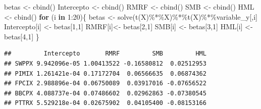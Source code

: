 \documentclass[
  12pt,
]{article}
\newenvironment{Shaded}{\begin{snugshade}}{\end{snugshade}}
\newcommand{\ControlFlowTok}[1]{\textcolor[rgb]{0.13,0.29,0.53}{\textbf{#1}}}
\newcommand{\DecValTok}[1]{\textcolor[rgb]{0.00,0.00,0.81}{#1}}
\newcommand{\FunctionTok}[1]{\textcolor[rgb]{0.00,0.00,0.00}{#1}}
\newcommand{\NormalTok}[1]{#1}
\newcommand{\OtherTok}[1]{\textcolor[rgb]{0.56,0.35,0.01}{#1}}
\newcommand{\SpecialCharTok}[1]{\textcolor[rgb]{0.00,0.00,0.00}{#1}}
\begin{document}
\begin{Shaded}
\begin{Highlighting}[]
\NormalTok{betas }\OtherTok{\textless{}{-}} \FunctionTok{cbind}\NormalTok{()}
\NormalTok{Intercepto }\OtherTok{\textless{}{-}} \FunctionTok{cbind}\NormalTok{()}
\NormalTok{RMRF }\OtherTok{\textless{}{-}} \FunctionTok{cbind}\NormalTok{()}
\NormalTok{SMB }\OtherTok{\textless{}{-}} \FunctionTok{cbind}\NormalTok{()}
\NormalTok{HML }\OtherTok{\textless{}{-}} \FunctionTok{cbind}\NormalTok{()}
\ControlFlowTok{for}\NormalTok{ (i }\ControlFlowTok{in} \DecValTok{1}\SpecialCharTok{:}\DecValTok{20}\NormalTok{)\{}
\NormalTok{  betas }\OtherTok{\textless{}{-}} \FunctionTok{solve}\NormalTok{(}\FunctionTok{t}\NormalTok{(X)}\SpecialCharTok{\%*\%}\NormalTok{X)}\SpecialCharTok{\%*\%}\FunctionTok{t}\NormalTok{(X)}\SpecialCharTok{\%*\%}\NormalTok{variable\_y[,i]}
\NormalTok{  Intercepto[i] }\OtherTok{\textless{}{-}}\NormalTok{ betas[}\DecValTok{1}\NormalTok{,}\DecValTok{1}\NormalTok{]}
\NormalTok{  RMRF[i]}\OtherTok{\textless{}{-}}\NormalTok{ betas[}\DecValTok{2}\NormalTok{,}\DecValTok{1}\NormalTok{]}
\NormalTok{  SMB[i] }\OtherTok{\textless{}{-}}\NormalTok{ betas[}\DecValTok{3}\NormalTok{,}\DecValTok{1}\NormalTok{]}
\NormalTok{  HML[i] }\OtherTok{\textless{}{-}}\NormalTok{ betas[}\DecValTok{4}\NormalTok{,}\DecValTok{1}\NormalTok{]}
\NormalTok{\}}
\end{Highlighting}
\end{Shaded}

\begin{Shaded}
\end{Shaded}

\begin{verbatim}
##         Intercepto       RMRF         SMB         HML
## SWPPX 9.942096e-05 1.00413522 -0.16580812  0.02512953
## PIMIX 1.261421e-04 0.17172704  0.06566635  0.06874362
## FPCIX 2.988896e-04 0.06750089  0.03917016 -0.07656522
## BBCPX 4.088737e-04 0.07486602  0.02962863 -0.07380545
## PTTRX 5.529218e-04 0.02675902  0.04105400 -0.08153166
\end{verbatim}
\end{document}
